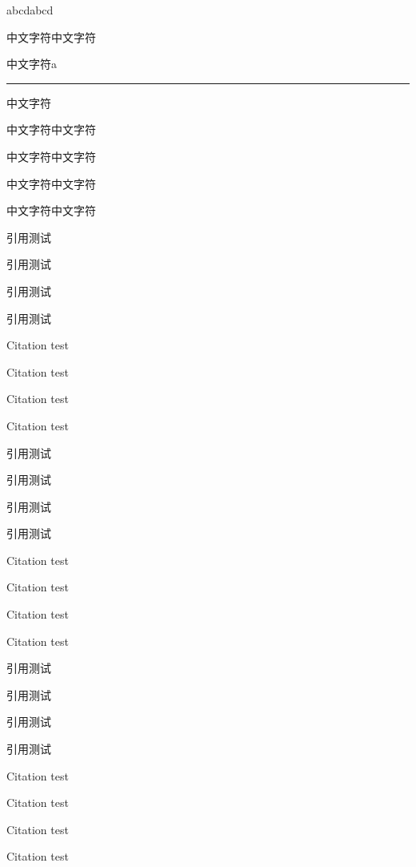 \documentclass{article}
\begin{document}
\begin{multicols}{2}

abcd\cite{sally_history_1985}abcd

中文字符\cite{sally_history_1985}中文字符

中文字符\cite{sally_history_1985}a\rule{1em}{1pt}中文字符

中文字符\cite{sally_history_1985}\mbox{}中文字符

中文字符\cite{sally_history_1985}\hbox{}中文字符

中文字符\cite{sally_history_1985}\makebox{}中文字符%

中文字符\cite{sally_history_1985}\hspace{0pt}中文字符%

引用\cite{foo}测试\par
引用\cite[42]{foo}测试\par
引用\cite[见][]{foo}测试\par
引用\cite[见][42]{foo}测试\par

Citation \cite{foo} test\par
Citation \cite[42]{foo} test\par
Citation \cite[see][]{foo} test\par
Citation \cite[see][42]{foo} test\par

引用\parencite{foo}测试\par
引用\parencite[42]{foo}测试\par
引用\parencite[见][]{foo}测试\par
引用\parencite[见][42]{foo}测试\par

Citation \parencite{foo} test\par
Citation \parencite[42]{foo} test\par
Citation \parencite[see][]{foo} test\par
Citation \parencite[see][42]{foo} test\par

引用\textcite{foo}测试\par
引用\textcite[42]{foo}测试\par
引用\textcite[见][]{foo}测试\par
引用\textcite[见][42]{foo}测试\par

Citation \textcite{foo} test\par
Citation \textcite[42]{foo} test\par
Citation \textcite[see][]{foo} test\par
Citation \textcite[see][42]{foo} test\par


\end{multicols}
\end{document}
